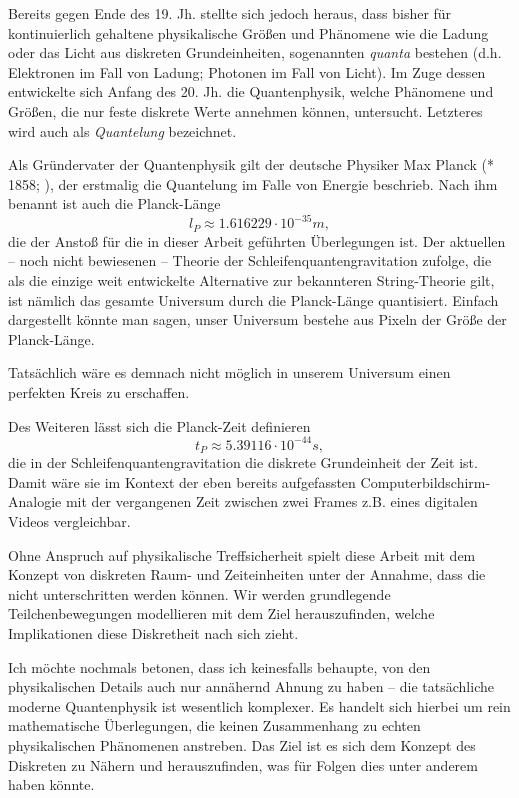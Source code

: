 \documentclass[a4paper,12pt,ngerman]{scrartcl}
\theoremstyle{plain}
\theoremstyle{plain}
\begin{document}
Bereits gegen Ende des 19. Jh. stellte sich jedoch heraus, dass bisher für kontinuierlich gehaltene physikalische Größen und Phänomene wie die Ladung oder das Licht aus diskreten Grundeinheiten, sogenannten \textit{quanta} bestehen (d.h. Elektronen im Fall von Ladung; Photonen im Fall von Licht). Im Zuge dessen entwickelte sich Anfang des 20. Jh. die Quantenphysik, welche Phänomene und Größen, die nur feste diskrete Werte annehmen können, untersucht. Letzteres wird auch als \textit{Quantelung} bezeichnet.

Als Gründervater der Quantenphysik gilt der deutsche Physiker Max Planck (* 1858; ), der erstmalig die Quantelung im Falle von Energie beschrieb. Nach ihm benannt ist auch die Planck-Länge
\[ l_P \approx 1.616 229 \cdot 10^{-35}m,\]
die der Anstoß für die in dieser Arbeit geführten Überlegungen ist. Der aktuellen -- noch nicht bewiesenen -- Theorie der Schleifenquantengravitation zufolge, die als die einzige weit entwickelte Alternative zur bekannteren String-Theorie gilt, ist nämlich das gesamte Universum durch die Planck-Länge quantisiert. Einfach dargestellt könnte man sagen, unser Universum bestehe aus Pixeln der Größe der Planck-Länge.

Tatsächlich wäre es demnach nicht möglich in unserem Universum einen perfekten Kreis zu erschaffen. 

Des Weiteren lässt sich die Planck-Zeit definieren
\[t_P \approx 5.39116\cdot 10^{-44}s,\]
die in der Schleifenquantengravitation die diskrete Grundeinheit der Zeit ist. Damit wäre sie im Kontext der eben bereits aufgefassten Computerbildschirm-Analogie mit der vergangenen Zeit zwischen zwei Frames z.B. eines digitalen Videos vergleichbar. 

Ohne Anspruch auf physikalische Treffsicherheit spielt diese Arbeit mit dem Konzept von diskreten Raum- und Zeiteinheiten unter der Annahme, dass die nicht unterschritten werden können. Wir werden grundlegende Teilchenbewegungen modellieren mit dem Ziel herauszufinden, welche Implikationen diese Diskretheit nach sich zieht. 

Ich möchte nochmals betonen, dass ich keinesfalls behaupte, von den physikalischen Details auch nur annähernd Ahnung zu haben -- die tatsächliche moderne Quantenphysik ist wesentlich komplexer. Es handelt sich hierbei um rein mathematische Überlegungen, die keinen Zusammenhang zu echten physikalischen Phänomenen anstreben. Das Ziel ist es sich dem Konzept des Diskreten zu Nähern und herauszufinden, was für Folgen dies unter anderem haben könnte. %
\end{document}
